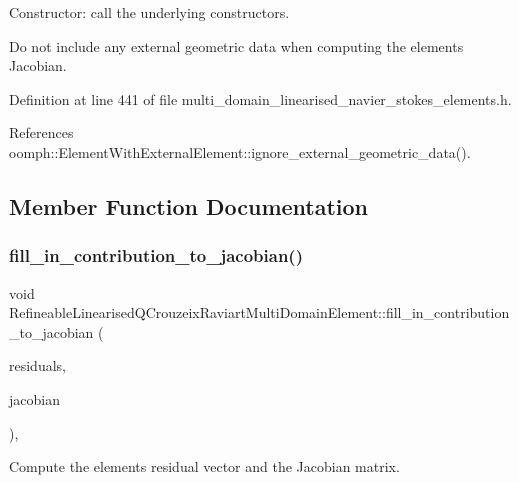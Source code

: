 Constructor\+: call the underlying constructors. 

Do not include any external geometric data when computing the element\textquotesingle{}s Jacobian. 

Definition at line 441 of file multi\+\_\+domain\+\_\+linearised\+\_\+navier\+\_\+stokes\+\_\+elements.\+h.



References oomph\+::\+Element\+With\+External\+Element\+::ignore\+\_\+external\+\_\+geometric\+\_\+data().



\subsection{Member Function Documentation}
\mbox{\label{classRefineableLinearisedQCrouzeixRaviartMultiDomainElement_a0ee5de787e1dfe477236eef98fc46092}} 
\subsubsection{\texorpdfstring{fill\+\_\+in\+\_\+contribution\+\_\+to\+\_\+jacobian()}{fill\_in\_contribution\_to\_jacobian()}}
{\footnotesize\ttfamily void Refineable\+Linearised\+Q\+Crouzeix\+Raviart\+Multi\+Domain\+Element\+::fill\+\_\+in\+\_\+contribution\+\_\+to\+\_\+jacobian (\begin{DoxyParamCaption}\item[{\hyperlink{classoomph_1_1Vector}{Vector}$<$ double $>$ \&}]{residuals,  }\item[{\hyperlink{classoomph_1_1DenseMatrix}{Dense\+Matrix}$<$ double $>$ \&}]{jacobian }\end{DoxyParamCaption})\hspace{0.3cm}{\ttfamily [inline]}, {\ttfamily [virtual]}}



Compute the element\textquotesingle{}s residual vector and the Jacobian matrix. 



